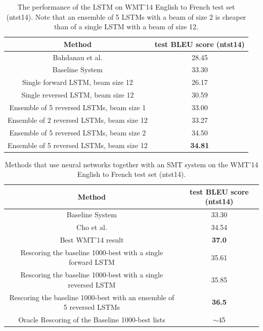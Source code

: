 \documentclass{article}
\begin{document}
\begin{table}[t]
\centering
\begin{small}
\begin{tabular}{|c|c|}
\hline
{\bf Method}  & {\bf test BLEU score (ntst14) } \\ \hline
Bahdanau et al. \cite{bog14}  &  28.45 \\ \hline
Baseline System  \cite{wmt14_en_fr} & 33.30 \\ \hline
\hline
Single forward LSTM, beam size 12 & 26.17 \\ \hline                 
Single reversed LSTM, beam size 12 & 30.59 \\ \hline
Ensemble of 5 reversed LSTMs, beam size 1  &  33.00 \\ \hline
Ensemble of 2 reversed LSTMs, beam size 12  &  33.27 \\ \hline
Ensemble of 5 reversed LSTMs, beam size 2  &  34.50 \\ \hline
Ensemble of 5 reversed LSTMs, beam size 12  &  {\bf 34.81} \\ \hline
\end{tabular}
\end{small}
\caption{The performance of the LSTM on WMT'14 English to French test
  set (ntst14).  Note that an ensemble of 5 LSTMs with a beam of size
  2 is cheaper than of a single LSTM with a beam of size 12.  }
\label{tab:blue_fr}
\end{table}

\begin{table}[]
\centering
\begin{small}
\begin{tabular}{|c|c|}
\hline
{\bf Method}  & {\bf test BLEU score (ntst14) } \\ \hline
Baseline System  \cite{wmt14_en_fr} & 33.30 \\ \hline
Cho et al. \cite{cho14}  & 34.54 \\ \hline 
Best WMT'14 result \cite{durrani-EtAl:2014:W14-33} &  {\bf 37.0} \\ \hline
\hline
Rescoring the baseline 1000-best with a single forward LSTM & 35.61 \\ \hline 
Rescoring the baseline 1000-best with a single reversed  LSTM & 35.85 \\ \hline  
Rescoring the baseline 1000-best with an ensemble of 5 reversed LSTMs  &  {\bf 36.5} \\ \hline    
\hline
Oracle Rescoring of the Baseline 1000-best lists    & $\sim$45 \\ \hline 
\end{tabular}
\end{small}
\caption{Methods that use neural networks together with an SMT system
  on the WMT'14 English to French test set (ntst14).}
\label{tab:blue_fr_rescore}
\end{table}
\end{document}
